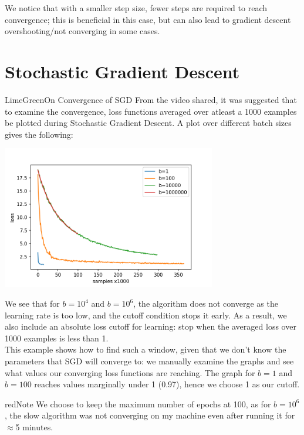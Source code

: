 \documentclass[12pt]{article}
\begin{document}
\begin{enumerate}[label=(\alph*)]
    We notice that with a smaller step size, fewer steps are required to reach convergence; this is beneficial in this case, but can also lead to gradient descent overshooting/not converging in some cases.

\end{enumerate}

\clearpage

\section*{Stochastic Gradient Descent}

\begin{mybox}{LimeGreen}{On Convergence of SGD}
From the video shared, it was suggested that to examine the convergence, loss functions averaged over atleast a 1000 examples be plotted during Stochastic Gradient Descent. A plot over different batch sizes gives the following:

\begin{center}
\includegraphics[width=0.7\textwidth]{../Q2/plots/loss.png}
\end{center}

We see that for $b=10^4$ and $b=10^6$, the algorithm does not converge as the learning rate is too low, and the cutoff condition stops it early. As a result, we also include an absolute loss cutoff for learning: stop when the averaged loss over 1000 examples is less than 1.\\

This example shows how to find such a window, given that we don't know the parameters that SGD will converge to: we manually examine the graphs and see what values our converging loss functions are reaching. The graph for $b=1$ and $b=100$ reaches values marginally under 1 (0.97), hence we choose 1 as our cutoff.
\end{mybox}

\begin{mybox}{red}{Note}
We choose to keep the maximum number of epochs at 100, as for $b=10^6$, the slow algorithm was not converging on my machine even after running it for $\approx$5 minutes.
\end{mybox}
\end{document}
